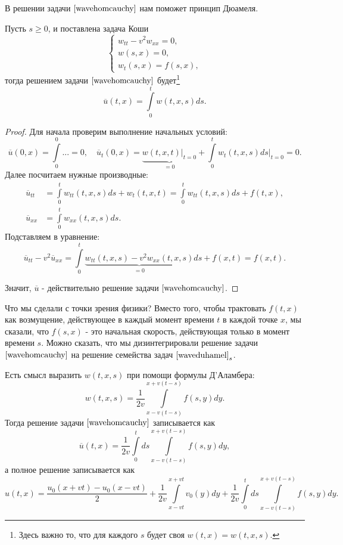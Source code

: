 В решении задачи $\eqref{wavehomcauchy}$ нам поможет принцип Дюамеля.
\begin{theorem}[Дюамель] Пусть $s \geq 0$, и поставлена задача Коши
\begin{equation}
	\begin{cases}
		w_{tt} - v^2 w_{xx} = 0, \\
		w(s,x) = 0, \\
		w_t(s,x) = f(s,x),
	\end{cases}
\label{waveduhamel}
\end{equation}
тогда решением задачи $\eqref{wavehomcauchy}$ будет\footnote{Здесь важно то, что для каждого $s$ будет своя $w(t,x) = w(t,x,s)$.}
$$ \overline{u}(t,x) = \int \limits_0^t w(t,x,s) ds.$$
\end{theorem}
\begin{proof}
Для начала проверим выполнение начальных условий:
$$\overline{u} (0,x) = \int \limits_0^0 ... = 0, \quad \overline{u}_t (0,x) = \underbrace {w(t,x,t) \Bigg\rvert_{t=0}}_{= 0} + \int \limits_0^t w_t(t,x,s)ds \Bigg\rvert_{t=0} = 0.$$
Далее посчитаем нужные производные:
\begin{align*}
	\overline{u}_{tt} &= \int \limits_0^t w_{tt} (t,x,s) ds + w_t (t, x, t) = \int \limits_0^t w_{tt} (t,x,s)ds + f(t,x), \\
	\overline{u}_{xx} &= \int \limits_0^t w_{xx} (t,x,s) ds.
\end{align*}
Подставляем в уравнение:
$$ \overline{u}_{tt} - v^2 \overline{u}_{xx} = \int \limits_0^t \underbrace{w_{tt}(t,x,s) - v^2 w_{xx}(t,x,s)}_{= 0} ds + f(x,t) = f(x,t).$$

Значит, $\overline{u}$ - действительно решение задачи $\eqref{wavehomcauchy}$.

\end{proof}
Что мы сделали с точки зрения физики? Вместо того, чтобы трактовать $f(t,x)$ как возмущение, действующее в каждый момент времени $t$ в каждой точке $x$, мы сказали, что $f(s,x)$ - это начальная скорость, действующая только в момент времени $s$. Можно сказать, что мы дизинтегрировали решение задачи $\eqref{wavehomcauchy}$ на решение семейства задач $\eqref{waveduhamel}_s$.

Есть смысл выразить $w(t,x,s)$ при помощи формулы Д'Аламбера:
$$ w(t,x,s) = \frac {1} {2v} \int \limits_{x-v(t-s)}^{x+v(t-s)} f(s,y) dy. $$
Тогда решение задачи  $\eqref{wavehomcauchy}$ записывается как
$$ \overline{u} (t,x) = \frac {1} {2v} \int \limits_0^t ds \int \limits_{x-v(t-s)}^{x+v(t-s)} f(s,y) dy,$$
а полное решение записывается как $$u(t,x) = \frac {u_0 (x+vt) - u_0 (x-vt)} {2} + \frac {1} {2v} \int \limits_{x-vt}^{x+vt} v_0(y)dy + \frac {1} {2v} \int \limits_0^t ds \int \limits_{x-v(t-s)}^{x+v(t-s)} f(s,y) dy.$$


